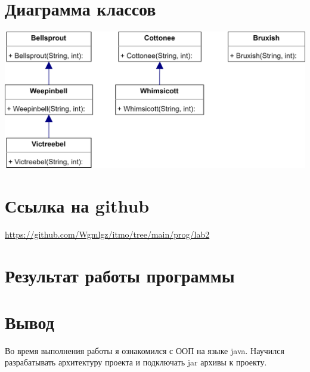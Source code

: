 \section{Диаграмма классов}

\begin{center}
  \includegraphics[scale=0.2]{diagram.png}
\end{center}

\section{Ссылка на github}
\url{https://github.com/Wgmlgz/itmo/tree/main/prog/lab2}
\section{Результат работы программы}
\section{Вывод}
Во время выполнения работы я ознакомился с ООП на языке java. Научился разрабатывать архитектуру проекта и подключать jar архивы к проекту.

